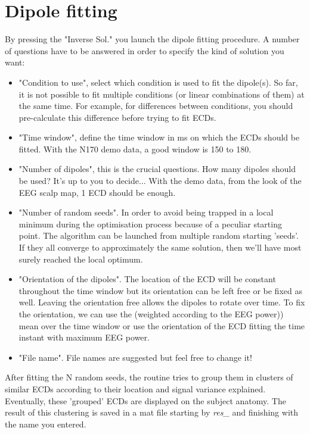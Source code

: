 \section{Dipole fitting}
By pressing the "Inverse Sol." you launch the dipole fitting procedure. A number of questions have to be answered in order to specify the kind of solution you want:
\begin{itemize}
\item "Condition to use", select which condition is used to fit the dipole(s). So far, it is not possible to fit multiple conditions (or linear combinations of them) at the same time. For example, for differences between conditions, you should pre-calculate this difference before trying to fit ECDs. \\
\item "Time window", define the time window in ms on which the ECDs should be fitted. With the N170 demo data, a good window is 150 to 180.\\
\item "Number of dipoles", this is the crucial questions. How many dipoles should be used? It's up to you to decide... With the demo data, from the look of the EEG scalp map, 1 ECD should be enough.\\
\item "Number of random seeds". In order to avoid being trapped in a local minimum during the optimisation process because of a peculiar starting point. The algorithm can be launched from multiple random starting 'seeds'. If they all converge to approximately the same solution, then we'll have most surely reached the local optimum.\\
\item "Orientation of the dipoles". The location of the ECD will be constant throughout the time window but its orientation can be left free or be fixed as well. Leaving the orientation free allows the dipoles to rotate over time. To fix the orientation, we can use the (weighted according to the EEG power)) mean over the time window or use the orientation of the ECD fitting the time instant with maximum EEG power.\\
\item "File name". File names are suggested but feel free to change it!
\end{itemize}

After fitting the N random seeds, the routine tries to group them in clusters of similar ECDs according to their location and signal variance explained. Eventually, these 'grouped' ECDs are displayed on the subject anatomy. The result of this clustering is saved in a mat file starting by {\it res\_} and finishing with the name you entered.

